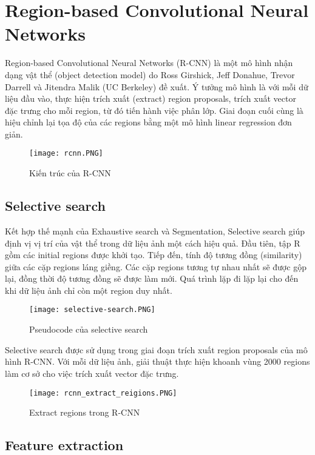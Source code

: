 \documentclass[../thesis.tex]{subfiles}
\begin{document}
\section{Region-based Convolutional Neural Networks}

Region-based Convolutional Neural Networks (R-CNN) là một mô hình nhận dạng vật thể (object detection model) do Ross Girshick, Jeff Donahue, Trevor Darrell và Jitendra Malik (UC Berkeley) đề xuất. Ý tưởng mô hình là với mỗi dữ liệu đầu vào, thực hiện trích xuất (extract) region proposals, trích xuất vector đặc trưng cho mỗi region, từ đó tiến hành việc phân lớp. Giai đoạn cuối cùng là hiệu chỉnh lại tọa độ của các regions bằng một mô hình linear regression đơn giản.

\begin{figure}[!htb]
	\centering
	\texttt{[image: rcnn.PNG]}
	\caption{Kiến trúc của R-CNN}\label{Fig:rcnn}
\end{figure}

\subsection{Selective search}

Kết hợp thế mạnh của Exhaustive search và Segmentation, Selective search giúp định vị vị trí của vật thể trong dữ liệu ảnh một cách hiệu quả. Đầu tiên, tập R gồm các initial regions được khởi tạo. Tiếp đến, tính độ tương đồng (similarity) giữa các cặp regions láng giềng. Các cặp regions tương tự nhau nhất sẽ được gộp lại, đồng thời độ tương đồng sẽ được làm mới. Quá trình lặp đi lặp lại cho đến khi dữ liệu ảnh chỉ còn một region duy nhất.

\begin{figure}[!htb]
	\centering
	\texttt{[image: selective-search.PNG]}
	\caption{Pseudocode của selective search}\label{Fig:selective_search}
\end{figure}

Selective search được sử dụng trong giai đoạn trích xuất region proposals của mô hình R-CNN. Với mỗi dữ liệu ảnh, giải thuật thực hiện khoanh vùng 2000 regions làm cơ sở cho việc trích xuất vector đặc trưng.

\begin{figure}[!htb]
	\centering
	\texttt{[image: rcnn\_extract\_reigions.PNG]}
	\caption{Extract regions trong R-CNN}\label{Fig:rcnn_extract_regions}
\end{figure}

\subsection{Feature extraction}
\end{document}

